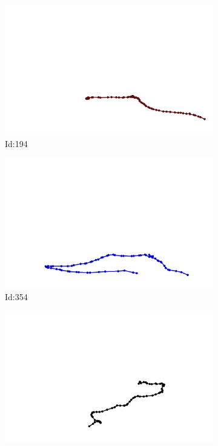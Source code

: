 \documentclass[12pt,twoside]{report}
\begin{document}
\begin{figure}
\centering
\begin{subfigure}[b]{0.20\textwidth}
\centering
\includegraphics[width=\textwidth]{../../trajectories/194.png}
\caption{Id:194}
\end{subfigure}
\begin{subfigure}[b]{0.20\textwidth}
\centering
\includegraphics[width=\textwidth]{../../trajectories/354.png}
\caption{Id:354}
\end{subfigure}
\begin{subfigure}[b]{0.20\textwidth}
\centering
\includegraphics[width=\textwidth]{../../trajectories/497.png}

\end{subfigure}
\end{figure}
\end{document}

